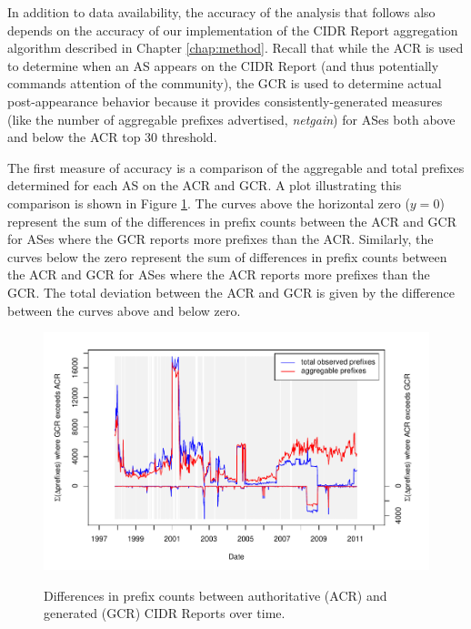 In addition to data availability, the accuracy of the analysis that follows also
depends on the accuracy of our implementation of the CIDR Report aggregation
algorithm described in Chapter \ref{chap:method}. Recall that while the ACR is
used to determine when an AS appears on the CIDR Report (and thus potentially
commands attention of the community), the GCR is used to determine actual
post-appearance behavior because it provides consistently-generated measures
(like the number of aggregable prefixes advertised, \emph{netgain}) for ASes
both above and below the ACR top 30 threshold.

The first measure of accuracy is a comparison of the aggregable and total
prefixes determined for each AS on the ACR and GCR. A plot illustrating this
comparison is shown in Figure \ref{fig:comp_prefix_error}. The curves above the
horizontal zero ($y=0$) represent the sum of the differences in prefix counts
between the ACR and GCR for ASes where the GCR reports more prefixes than the
ACR. Similarly, the curves below the zero represent the sum of differences in
prefix counts between the ACR and GCR for ASes where the ACR reports more
prefixes than the GCR. The total deviation between the ACR and GCR is
given by the difference between the curves above and below zero.

\begin{figure}[h!]
\begin{centering}
\begin{singlespace}
    \includegraphics[width=6in]{figures/cidr_report_validity_prefix_error.pdf}
    \vspace{-2em}\\
    \caption{Differences in prefix counts between authoritative (ACR) and
        generated (GCR) CIDR Reports over time.}
    \label{fig:comp_prefix_error}
\end{singlespace}
\end{centering}
\end{figure}

